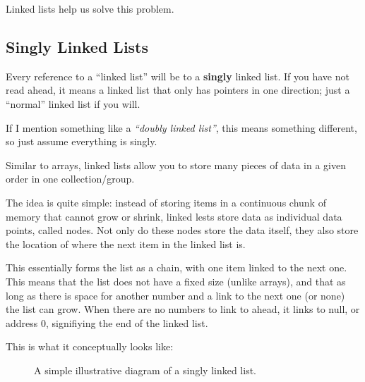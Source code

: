 \documentclass[./main.tex]{subfiles}
\begin{document}
Linked lists help us solve this problem.

\subsection{Singly Linked Lists}

\begin{importantbox}
    Every reference to a ``linked list'' will be to a \textbf{singly} linked list.
    If you have not read ahead, it means a linked list that only has pointers in one
    direction; just a ``normal'' linked list if you will.

    If I mention something like a \emph{``doubly linked list''}, this means something
    different, so just assume everything is singly.
\end{importantbox}

Similar to arrays, linked lists allow you to store many pieces of data in a given order in one collection/group.

The idea is quite simple: instead of storing items in a continuous chunk of memory that cannot grow or shrink, linked
lests store data as individual data points, called nodes. Not only do these nodes store the data itself, they also
store the location of where the next item in the linked list is.

This essentially forms the list as a chain, with one item linked to the next one. This means that the list does not have
a fixed size (unlike arrays), and that as long as there is space for another number and a link to the next one (or none)
the list can grow. When there are no numbers to link to ahead, it links to {\mono null}, or address 0, signifiying the
end of the linked list.

This is what it conceptually looks like:

\begin{figure}[htbp]
    \centering
    \caption{A simple illustrative diagram of a singly linked list.}
\end{figure}
\end{document}
